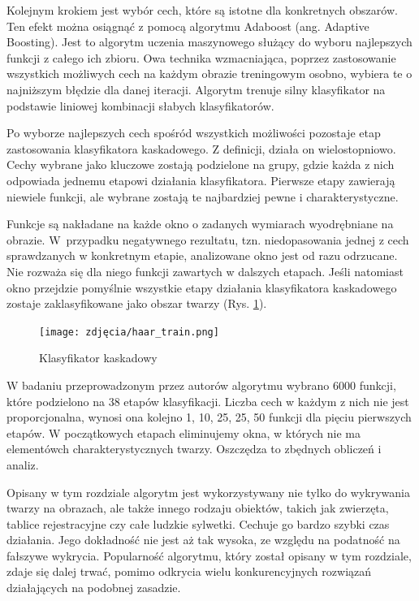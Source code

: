 Kolejnym krokiem jest wybór cech, które są istotne dla konkretnych obszarów. Ten efekt można osiągnąć z pomocą algorytmu Adaboost (ang. Adaptive Boosting). Jest to  algorytm uczenia maszynowego służący do wyboru najlepszych funkcji z całego ich zbioru. Owa technika wzmacniająca, poprzez zastosowanie wszystkich możliwych cech na każdym obrazie treningowym osobno, wybiera te o najniższym błędzie dla danej iteracji. Algorytm trenuje silny klasyfikator na podstawie liniowej kombinacji słabych klasyfikatorów.
 
Po wyborze najlepszych cech spośród wszystkich możliwości pozostaje etap zastosowania klasyfikatora kaskadowego. Z definicji, działa on wielostopniowo. Cechy wybrane jako kluczowe zostają podzielone na grupy, gdzie każda z nich odpowiada jednemu etapowi działania klasyfikatora. Pierwsze etapy zawierają niewiele funkcji, ale wybrane zostają te najbardziej pewne i charakterystyczne. 
 
Funkcje są nakładane na każde okno o zadanych wymiarach wyodrębniane na obrazie. W~przypadku negatywnego rezultatu, tzn. niedopasowania jednej z cech sprawdzanych w konkretnym etapie, analizowane okno jest od razu odrzucane. Nie rozważa się dla niego funkcji zawartych w dalszych etapach. Jeśli natomiast okno przejdzie pomyślnie wszystkie etapy działania klasyfikatora kaskadowego zostaje zaklasyfikowane jako obszar twarzy (Rys. \ref{fig:cascadeClasificator}).  
 
\begin{figure}[h]
	\centering
	\texttt{[image: zdjęcia/haar\_train.png]}
	\caption{Klasyfikator kaskadowy \cite{haarCascade}} 
	\label{fig:cascadeClasificator}
\end{figure}

W badaniu przeprowadzonym przez autorów algorytmu wybrano 6000 funkcji, które podzielono na 38 etapów klasyfikacji. Liczba cech w każdym z nich nie jest proporcjonalna, wynosi ona kolejno 1, 10, 25, 25, 50 funkcji dla pięciu pierwszych etapów. W początkowych etapach eliminujemy okna, w których nie ma elementówch charakterystycznych twarzy. Oszczędza to zbędnych obliczeń i analiz.

Opisany w tym rozdziale algorytm jest wykorzystywany nie tylko do wykrywania twarzy na obrazach, ale także innego rodzaju obiektów, takich jak zwierzęta, tablice rejestracyjne czy całe ludzkie sylwetki. Cechuje go bardzo szybki czas działania. Jego dokładność nie jest aż tak wysoka, ze względu na podatność na fałszywe wykrycia.  Popularność algorytmu, który został opisany w tym rozdziale, zdaje się dalej trwać, pomimo odkrycia wielu konkurencyjnych rozwiązań działających na podobnej zasadzie. 

